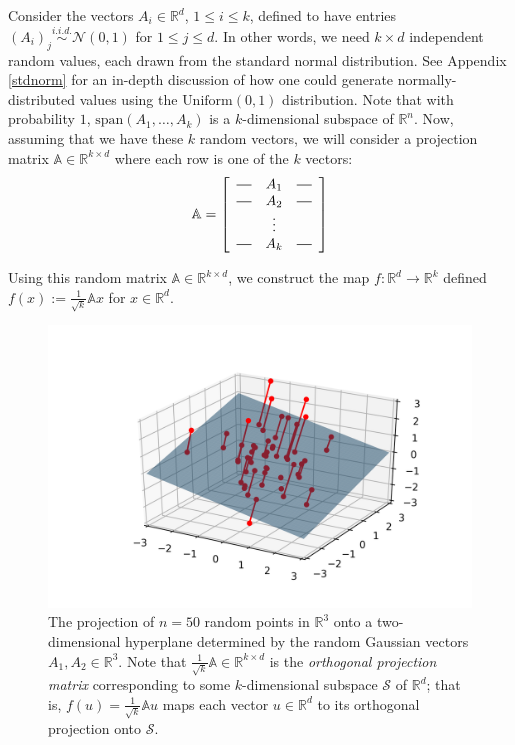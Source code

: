 \documentclass{article}
\newcommand*{\horzbar}{\rule[.5ex]{2.5ex}{0.5pt}}
\begin{document}
Consider the vectors $A_i \in \mathbb{R}^d$, $1 \le i \le k$, defined to have entries $(A_i)_j \overset{i.i.d.}{\sim} \mathcal{N}(0, 1)$ for $1 \le j \le d$. In other words, we need $k\times d$ independent random values, each drawn from the standard normal distribution. See Appendix \ref{stdnorm} for an in-depth discussion of how one could generate normally-distributed values using the $\text{Uniform}(0,1)$ distribution. Note that with probability $1$, $\text{span}\left(A_1, \ldots, A_k \right)$ is a $k$-dimensional subspace of $\mathbb{R}^n$. Now, assuming that we have these $k$ random vectors, we will consider a projection matrix $\mathbb{A} \in \mathbb{R}^{k \times d}$ where each row is one of the $k$ vectors:
\begin{align*}
        \mathbb{A} = 
        \left[
            \begin{array}{ccc}
            \horzbar & A_{1} & \horzbar \\
            \horzbar & A_{2} & \horzbar \\
            & \vdots &  \\
            \horzbar & A_{k} & \horzbar
            \end{array}
        \right]
\end{align*}

Using this random matrix $\mathbb{A} \in \mathbb{R}^{k \times d}$, we construct the map $f: \mathbb{R}^d \rightarrow \mathbb{R}^k$ defined $f(x) := \frac{1}{\sqrt{k}}\mathbb{A}x$ for $x \in \mathbb{R}^d$.

    \begin{figure}[H]
        \centering
        \includegraphics[width=\textwidth]{imgs/random_projections.png}
        \caption{The projection of $n = 50$ random points in $\mathbb{R}^3$ onto a two-dimensional hyperplane determined by the random Gaussian vectors $A_1, A_2 \in \mathbb{R}^3$. Note that $\frac{1}{\sqrt{k}} \mathbb{A} \in \mathbb{R}^{k \times d}$ is the \textit{orthogonal projection matrix} corresponding to some $k$-dimensional subspace $\mathcal{S}$ of $\mathbb{R}^d$; that is, $f(u) = \frac{1}{\sqrt{k}}\mathbb{A}u$ maps each vector $u \in \mathbb{R}^d$ to its orthogonal projection onto $\mathcal{S}$.}
    \end{figure}
    
\end{document}
